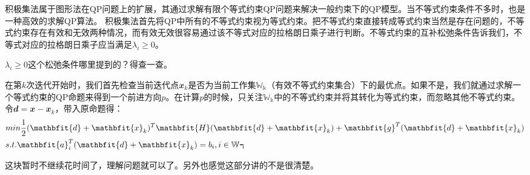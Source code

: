 积极集法属于图形法在QP问题上的扩展，其通过求解有限个等式约束QP问题来解决一般约束下的QP模型。当不等式约束条件不多时，也是一种高效的求解QP算法。
积极集法首先将QP中所有的不等式约束视为等式约束。把不等式约束直接转成等式约束当然是存在问题的，不等式约束存在有效和无效两种情况，而有效无效很容易通过该不等式对应的拉格朗日乘子进行判断。不等式约束的互补松弛条件告诉我们，不等式对应的拉格朗日乘子应当满足$\lambda_i\geq 0$。
\begin{note}
  $\lambda_i\geq 0$这个松弛条件哪里提到的？得查一查。
\end{note}

在第$k$次迭代开始时，我们首先检查当前迭代点$\mathbfit{x}_k$是否为当前工作集$\mathbb{W_k}$（有效不等式约束集合）下的最优点。如果不是，我们就通过求解一个等式约束的QP命题来得到一个前进方向$p$。在计算$p$的时候，只关注$\mathbb{W_k}$中的不等式约束并将其转化为等式约束，而忽略其他不等式约束。令$\mathbfit{d}=\mathbfit{x}-\mathbfit{x}_k$，带入原命题得：
\begin{align}
  &min \quad \frac{1}{2}(\mathbfit{d}+\mathbfit{x}_k)^T\mathbfit{H}(\mathbfit{d}+\mathbfit{x}_k)+\mathbfit{g}^T(\mathbfit{d}+\mathbfit{x}_k) \notag\\
  &s.t. \quad \mathbfit{a}_i^T(\mathbfit{d}+\mathbfit{x}_k)=b_i, \quad i \in \mathbb{W_k}
\end{align}

\begin{note}
  这块暂时不继续花时间了，理解问题就可以了。另外也感觉这部分讲的不是很清楚。
\end{note}